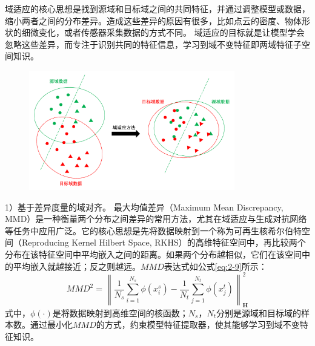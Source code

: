 域适应的核心思想是找到源域和目标域之间的共同特征，并通过调整模型或数据，缩小两者之间的分布差异。造成这些差异的原因有很多，比如点云的密度、物体形状的细微变化，或者传感器采集数据的方式不同。
域适应的目标就是让模型学会忽略这些差异，而专注于识别共同的特征信息，学习到域不变特征即两域特征子空间知识。
\begin{figure}[h]
    \centering
    \includegraphics[width = 0.8\textwidth]{ljx/figure/2-3DA.pdf}
    \label{fig:2-3}
\end{figure}

1）基于差异度量的域对齐。
最大均值差异（Maximum Mean Discrepancy, MMD）是一种衡量两个分布之间差异的常用方法，尤其在域适应与生成对抗网络等任务中应用广泛。它的核心思想是先将数据映射到一个称为可再生核希尔伯特空间（Reproducing Kernel Hilbert Space, RKHS）的高维特征空间中，再比较两个分布在该特征空间中平均嵌入之间的距离。如果两个分布越相似，它们在该空间中的平均嵌入就越接近；反之则越远。$MMD$表达式如公式\eqref{eq:2-9}所示：
\begin{equation}
    \label{eq:2-9}
    MMD^2 = \left\| \frac{1}{N_s} \sum_{i=1}^{N_s} \phi(x_i^s) - \frac{1}{N_t} \sum_{j=1}^{N_t} \phi(x_j^t) \right\|_{\mathbf{H}}^2
\end{equation}
式中，$\phi(\cdot)$是将数据映射到高维空间的核函数；$N_s$，$N_t$分别是源域和目标域的样本数。通过最小化$MMD$的方式，约束模型特征提取器，使其能够学习到域不变特征知识。

